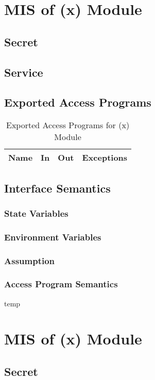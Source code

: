 \documentclass[11pt]{article}
\begin{document}
    \section{MIS of (x) Module}
    \subsection{Secret}
    \subsection{Service}
    \subsection{Exported Access Programs}
    \begin{table}[h]
    \caption{Exported Access Programs for (x) Module}
    \begin{tabular}{p{4cm}p{2cm}p{2cm}p{4cm}}
    Name & In & Out & Exceptions\\
    \hline
    
    \hline
    \end{tabular}
    \end{table}
    \subsection{Interface Semantics}
    \subsubsection{State Variables}
    \subsubsection{Environment Variables}
    \subsubsection{Assumption}
    \subsubsection{Access Program Semantics}
    temp
    \newline
     \section{MIS of (x) Module}
     \subsection{Secret}
\end{document}

